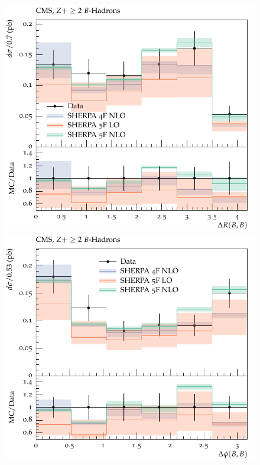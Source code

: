 \documentclass[11pt]{cernrep} \usepackage{graphicx,epsfig} 
\begin{document}
\begin{figure}[htbp]
   \includegraphics[scale=0.5]{figs/zbb/d01-x01-y01.pdf} 
   \includegraphics[scale=0.5]{figs/zbb/d02-x01-y01.pdf} 
\end{figure}
\end{document}
